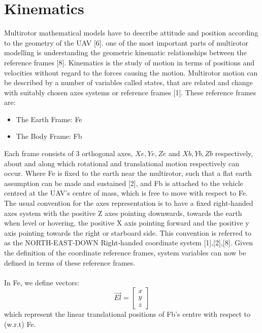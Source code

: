 \documentclass[12pt,a4paper,twoside]{report}
\begin{document}
		\section{Kinematics}
			
			Multirotor mathematical models have to describe attitude and position according to the geometry of the UAV [6]. one of the most important parts of multirotor modelling is understanding the geometric kinematic relationships between the reference frames [8]. Kinematics is the study of motion in terms of positions and velocities without regard to the forces causing the motion. Multirotor motion can be described by a number of variables called states, that are related and change with suitably chosen axes systems or reference frames [1]. These reference frames are:
				
			\begin{itemize}
				\item
					The Earth Frame: Fe
				\item 
					The Body Frame: Fb  
			\end{itemize}
			\space
			Each frame consists of 3 orthogonal axes, \(Xe,Ye,Ze\) and \(Xb,Yb,Zb\) respectively, about and along which rotational and translational motion respectively can occur. Where Fe is fixed to the earth near the multirotor, such that a flat earth assumption can be made and sustained [2], and Fb is attached to the vehicle centred at the UAV’s centre of mass, which is free to move with respect to Fe. The usual convention for the axes representation is to have a fixed right-handed axes system with the positive Z axes pointing downwards, towards the earth when level or hovering, the positive X axis pointing forward and the positive y axis pointing towards the right or starboard side. This convention is referred to as the NORTH-EAST-DOWN Right-handed coordinate system [1],[2],[8]. Given the definition of the coordinate reference frames, system variables can now be defined in terms of these reference frames.
			\\ \\
			In Fe, we define vectors:
			\\
			\begin{equation}
				\vec{El} = 
				\begin{bmatrix}
					x \\
					y \\
					z
				\end{bmatrix}
			\end{equation}
			which represent the linear translational positions of Fb’s centre with respect to (w.r.t) Fe.
\end{document}
